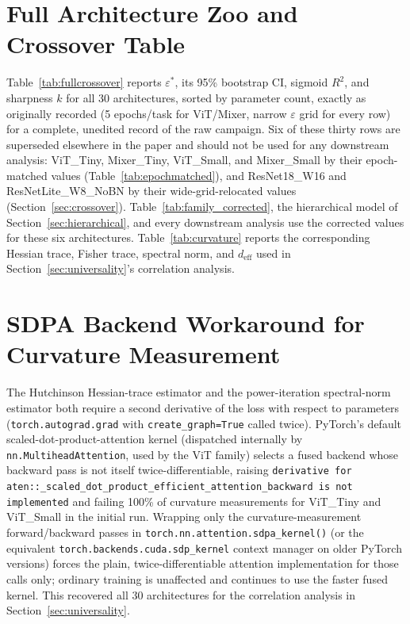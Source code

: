 \documentclass[11pt]{article}
\newcommand{\eps}{\varepsilon}
\newcommand{\epsstar}{\eps^{*}}
\begin{document}
\appendix

\section{Full Architecture Zoo and Crossover Table}
\label{app:fulltable}
Table~\ref{tab:fullcrossover} reports $\epsstar$, its 95\% bootstrap CI,
sigmoid $R^2$, and sharpness $k$ for all 30 architectures, sorted by
parameter count, exactly as originally recorded (5 epochs/task for
ViT/Mixer, narrow $\eps$ grid for every row) for a complete, unedited
record of the raw campaign. Six of these thirty rows are superseded
elsewhere in the paper and should not be used for any downstream analysis:
ViT\_Tiny, Mixer\_Tiny, ViT\_Small, and Mixer\_Small by their epoch-matched
values (Table~\ref{tab:epochmatched}), and ResNet18\_W16 and
ResNetLite\_W8\_NoBN by their wide-grid-relocated values
(Section~\ref{sec:crossover}). Table~\ref{tab:family_corrected}, the
hierarchical model of Section~\ref{sec:hierarchical}, and every downstream
analysis use the corrected values for these six architectures.
Table~\ref{tab:curvature} reports the corresponding
Hessian trace, Fisher trace, spectral norm, and $d_{\mathrm{eff}}$ used in
Section~\ref{sec:universality}'s correlation analysis.





\section{SDPA Backend Workaround for Curvature Measurement}
\label{app:sdpa}
The Hutchinson Hessian-trace estimator and the power-iteration spectral-norm
estimator both require a second derivative of the loss with respect to
parameters (\texttt{torch.autograd.grad} with \texttt{create\_graph=True}
called twice). PyTorch's default scaled-dot-product-attention kernel
(dispatched internally by \texttt{nn.MultiheadAttention}, used by the ViT
family) selects a fused backend whose backward pass is not itself
twice-differentiable, raising \texttt{derivative for
aten::\_scaled\allowbreak\_dot\allowbreak\_product\allowbreak\_efficient\allowbreak\_attention\allowbreak\_backward is not
implemented} and failing 100\% of curvature measurements for ViT\_Tiny and
ViT\_Small in the initial run. Wrapping only the curvature-measurement
forward/backward passes in
\texttt{torch.nn.attention.sdpa\_kernel()}
(or the equivalent \texttt{torch.backends.cuda.sdp\_kernel}
context manager on older PyTorch versions) forces the plain, twice-differentiable
attention implementation for those calls only; ordinary training is
unaffected and continues to use the faster fused kernel. This recovered all
30 architectures for the correlation analysis in Section~\ref{sec:universality}.
\end{document}
